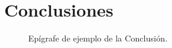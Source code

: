  \section{Conclusiones}
   
    \begin{figure}[ht]
      \centering
      \caption{Epígrafe de ejemplo de la Conclusión.}
      \label{fig:ConclImage}
    \end{figure}

